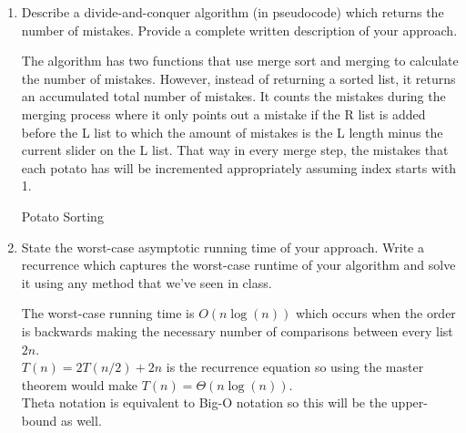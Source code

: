 \documentclass[11pt]{article}
\theoremstyle{definition}
\theoremstyle{theorem}
\newcommand{\solution}[1]{\medskip\noindent{\color{DarkBlue}\textbf{Solution:}} #1}
\newcommand{\solution}[1]{}
\begin{document}
\begin{enumerate}[label=(\alph*)]
\item Describe a divide-and-conquer algorithm (in pseudocode) which returns the number of mistakes. Provide a complete written description of your approach.

\solution
The algorithm has two functions that use merge sort and merging to calculate the number of mistakes. However, instead of returning a sorted list, it returns an accumulated total number of mistakes. It counts the mistakes during the merging process where it only points out a mistake if the R list is added before the L list to which the amount of mistakes is the L length minus the current slider on the L list. That way in every merge step, the mistakes that each potato has will be incremented appropriately assuming index starts with 1.
\begin{algorithm}[H]
\caption{Potato Sorting}
\end{algorithm}

\item State the worst-case asymptotic running time of your approach.  Write a recurrence which captures the worst-case runtime of your algorithm and solve it using any method that we've seen in class.

\solution
The worst-case running time is $O(n\log(n))$ which occurs when the order is backwards making the necessary number of comparisons between every list $2n$. \\
$T(n) = 2T(n/2) + 2n$ is the recurrence equation so using the master theorem would make $T(n) = \Theta(n\log(n))$. \\
Theta notation is equivalent to Big-O notation so this will be the upper-bound as well.

\end{enumerate}
\end{document}
